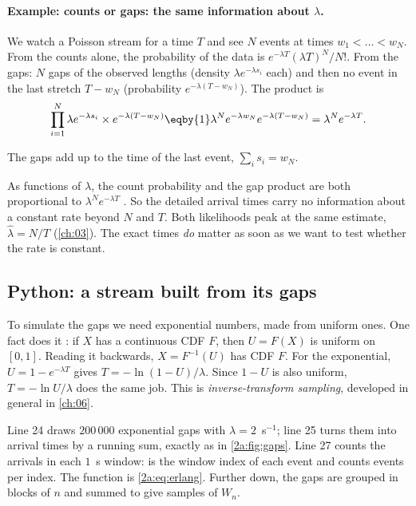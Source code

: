 \paragraph{Example: counts or gaps: the same information about $\lambda$.}
We watch a Poisson stream for a time $T$ and see $N$ events at times $w_1<\dots<w_N$. From the counts alone, the probability of the data is $e^{-\lambda T}(\lambda T)^N/N!$. From the gaps: $N$ gaps of the observed lengths (density $\lambda e^{-\lambda s_i}$ each) and then no event in the last stretch $T-w_N$ (probability $e^{-\lambda(T-w_N)}$). The product is
\begin{align*}
  \prod_{i=1}^N\lambda e^{-\lambda s_i}\times e^{-\lambda(T-w_N)} \eqby{1} \lambda^Ne^{-\lambda w_N}e^{-\lambda(T-w_N)} = \lambda^Ne^{-\lambda T}.
\end{align*}
\begin{explain}
  \item The gaps add up to the time of the last event, $\sum_is_i=w_N$.
\end{explain}
As functions of $\lambda$, the count probability and the gap product are both proportional to $\lambda^Ne^{-\lambda T}$ . So the detailed arrival times carry no information about a constant rate beyond $N$ and $T$. Both likelihoods peak at the same estimate, $\hat\lambda=N/T$ (\cref{ch:03}). The exact times \emph{do} matter as soon as we want to test whether the rate is constant.

\subsection{Python: a stream built from its gaps}

To simulate the gaps we need exponential numbers, made from uniform ones. One fact does it : if $X$ has a continuous CDF $F$, then $U=F(X)$ is uniform on $[0,1]$. Reading it backwards, $X=F^{-1}(U)$ has CDF $F$. For the exponential, $U=1-e^{-\lambda T}$ gives $T=-\ln(1-U)/\lambda$. Since $1-U$ is also uniform, $T=-\ln U/\lambda$ does the same job. This is \emph{inverse-transform sampling}, developed in general in \cref{ch:06}.


Line 24 draws $200\,000$ exponential gaps with $\lambda=2$~s$^{-1}$; line 25 turns them into arrival times by a running sum, exactly as in \cref{2a:fig:gaps}. Line 27 counts the arrivals in each $1$~s window:  is the window index of each event and  counts events per index. The function  is \eqref{2a:eq:erlang}. Further down, the gaps are grouped in blocks of $n$ and summed to give samples of $W_n$.

